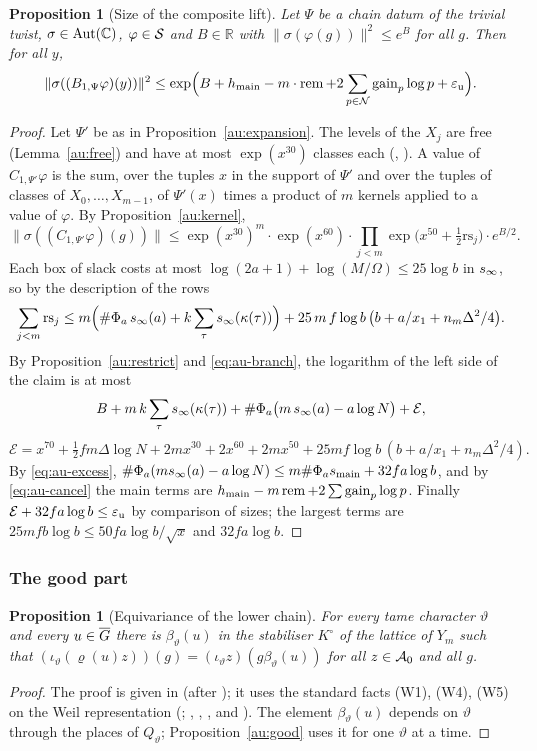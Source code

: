 \documentclass[10pt]{amsart}
\newtheorem{proposition}[theorem]{Proposition}
\theoremstyle{definition}
\theoremstyle{remark}
\newcommand{\C}{\mathbb C}
\newcommand{\R}{\mathbb R}
\begin{document}
\begin{proposition}[Size of the composite lift]\label{au:size}
Let $\Psi$ be a chain datum of the trivial twist, $\sigma\in\auAut(\C)$, $\varphi\in\mathcal S$ and
$B\in\R$ with $\|\sigma(\varphi(g))\|^2\le e^B$ for all $g$. Then for all $y$,
\[
\|\sigma((B_{1,\Psi}\varphi)(y))\|^2\le\exp\Bigl(B+h_{\mathrm{main}}-m\cdot\operatorname{rem}+2\sum_{p\in\mathcal N}
\operatorname{gain}_p\log p+\varepsilon_{\mathrm u}\Bigr).
\]
\end{proposition}
\begin{proof}
Let $\Psi'$ be as in Proposition~\ref{au:expansion}. The levels of the $X_j$ are free
(Lemma~\ref{au:free}) and have at most $\exp(x^{30})$ classes each ({\cite[Proposition~7.20]{P49}}, {\cite[Lemma~8.8]{P49}}). A value of $C_{1,\Psi'}\varphi$ is the sum, over the tuples $x$ in the
support of $\Psi'$ and over the tuples of classes of $X_0,\dots,X_{m-1}$, of $\Psi'(x)$ times a
product of $m$ kernels applied to a value of $\varphi$. By Proposition~\ref{au:kernel},
\[
\|\sigma((C_{1,\Psi'}\varphi)(g))\|\le\exp(x^{30})^m\cdot\exp(x^{60})\cdot\prod_{j<m}\exp\bigl(
x^{50}+\tfrac12\mathrm{rs}_j\bigr)\cdot e^{B/2}.
\]
Each box of slack costs at most $\log(2a+1)+\log(M/\Omega)\le25\log b$ in $s_\infty$, so by the
description of the rows
\[
\sum_{j<m}\mathrm{rs}_j\le m\Bigl(\#\Phi_a\,s_\infty(a)+k\sum_\tau s_\infty(\kappa(\tau))\Bigr)+
25\,m\,f\log b\,\bigl(b+a/x_1+n_m\Delta^2/4\bigr).
\]
By Proposition~\ref{au:restrict} and \eqref{eq:au-branch}, the logarithm of the left side of the
claim is at most
\[
B+m\,k\sum_\tau s_\infty(\kappa(\tau))+\#\Phi_a\bigl(m\,s_\infty(a)-a\log N\bigr)+\mathcal E,
\]
\[
\mathcal E=x^{70}+\tfrac12fm\Delta\log N+2mx^{30}+2x^{60}+2mx^{50}+25mf\log b\,(b+a/x_1+
n_m\Delta^2/4).
\]
By \eqref{eq:au-excess}, $\#\Phi_a(ms_\infty(a)-a\log N)\le m\#\Phi_as_{\mathrm{main}}+32fa\log b$, and by
\eqref{eq:au-cancel} the main terms are $h_{\mathrm{main}}-m\operatorname{rem}+2\sum\operatorname{gain}_p\log p$. Finally
$\mathcal E+32fa\log b\le\varepsilon_{\mathrm u}$ by comparison of sizes; the largest terms are $25mfb\log b\le
50fa\log b/\sqrt x$ and $32fa\log b$.
\end{proof}

\subsubsection*{The good part}

\begin{proposition}[Equivariance of the lower chain]\label{au:equiv}
For every tame character $\vartheta$ and every $u\in\overline G$ there is $\beta_\vartheta(u)$ in the
stabiliser $K^\circ$ of the lattice of $Y_m$ such
that $(\iota_\vartheta(\varrho(u)z))(g)=(\iota_\vartheta z)(g\beta_\vartheta(u))$ for all
$z\in\mathcal A_0$ and all $g$.
\end{proposition}
\begin{proof}
The proof is given in {\cite[\S5.1.3]{P49}} (after {\cite[Lemma~5.5]{P49}}); it uses the standard facts (W1),
(W4), (W5) on the Weil representation ({\cite[Lemma~5.2]{P49}}; \cite{WeilActa},
\cite{KudlaSplitting}, \cite{HKS}, and {\cite[\S2]{P49}}). The element $\beta_\vartheta(u)$ depends on $\vartheta$ through
the places of $Q_\vartheta$; Proposition~\ref{au:good} uses it for one $\vartheta$ at a time.
\end{proof}
\end{document}

